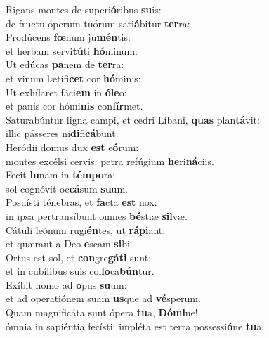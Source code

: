 \evenverse Rigans montes de superi\textbf{ó}ribus \textbf{su}is:~\*\\
\evenverse de fructu óperum tuórum sati\textbf{á}bitur \textbf{ter}ra:\\
\oddverse Prodúcens \textbf{fœ}num ju\textbf{mén}tis:~\*\\
\oddverse et herbam servi\textbf{tú}ti \textbf{hó}minum:\\
\evenverse Ut edúcas \textbf{pa}nem de \textbf{ter}ra:~\*\\
\evenverse et vinum lætífi\textbf{cet} cor \textbf{hó}minis:\\
\oddverse Ut exhílaret fáci\textbf{em} in \textbf{ó}\textbf{le}o:~\*\\
\oddverse et panis cor hómi\textbf{nis} con\textbf{fír}met.\\
\evenverse Saturabúntur ligna campi, et cedri Líbani, \textbf{quas} plan\textbf{tá}vit:~\*\\
\evenverse illic pásseres ni\textbf{di}fi\textbf{cá}bunt.\\
\oddverse Heródii domus dux \textbf{est} e\textbf{ó}rum:~\*\\
\oddverse montes excélsi cervis: petra refúgium \textbf{he}ri\textbf{ná}ciis.\\
\evenverse Fecit \textbf{lu}nam in \textbf{tém}\textbf{po}ra:~\*\\
\evenverse sol cognóvit oc\textbf{cá}sum \textbf{su}um.\\
\oddverse Posuísti ténebras, et \textbf{fa}cta \textbf{est} nox:~\*\\
\oddverse in ipsa pertransíbunt omnes \textbf{bé}stiæ \textbf{sil}væ.\\
\evenverse Cátuli leónum rugi\textbf{én}tes, ut \textbf{rá}\textbf{pi}ant:~\*\\
\evenverse et quærant a Deo \textbf{e}scam \textbf{si}bi.\\
\oddverse Ortus est sol, et \textbf{con}gre\textbf{gá}\textbf{ti} sunt:~\*\\
\oddverse et in cubílibus suis col\textbf{lo}ca\textbf{bún}tur.\\
\evenverse Exíbit homo ad \textbf{o}pus \textbf{su}um:~\*\\
\evenverse et ad operatiónem suam \textbf{us}que ad \textbf{vé}sperum.\\
\oddverse Quam magnificáta sunt ópera \textbf{tu}a, \textbf{Dó}\textbf{mi}ne!~\*\\
\oddverse ómnia in sapiéntia fecísti: impléta est terra possessi\textbf{ó}ne \textbf{tu}a.\\

